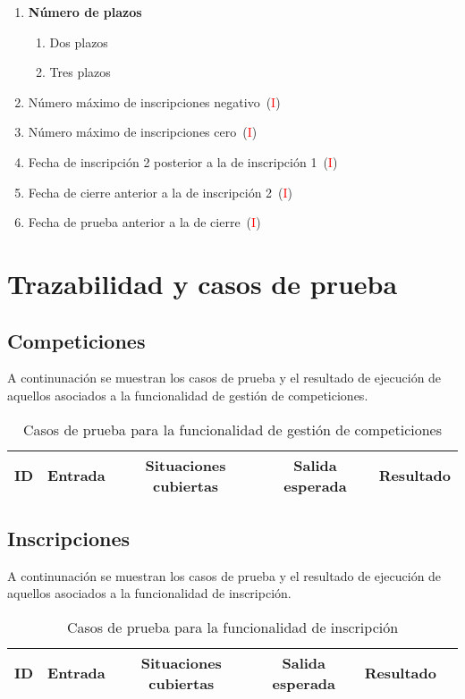 \begin{itemize}
\begin{enumerate}[label=SC\arabic*.]
			\item \textbf{Número de plazos}
			\begin{enumerate}[label*=\arabic*]
				\item Dos plazos
				\item Tres plazos
			\end{enumerate}
			\item Número máximo de inscripciones negativo~(\textcolor{red}{I})
			\item Número máximo de inscripciones cero~(\textcolor{red}{I})
			\item Fecha de inscripción 2 posterior a la de inscripción 1~(\textcolor{red}{I})
			\item Fecha de cierre anterior a la de inscripción 2~(\textcolor{red}{I})
			\item Fecha de prueba anterior a la de cierre~(\textcolor{red}{I})
		 \end{enumerate}
\end{itemize}

\section{Trazabilidad y casos de prueba}
\subsection{Competiciones}
A continunación se muestran los casos de prueba y el resultado de ejecución de aquellos asociados
a la funcionalidad de gestión de competiciones.

\begin{table}[ht]
	\centering
	\caption{Casos de prueba para la funcionalidad de gestión de competiciones}
	\begin{tabular}{|c|c|c|c|c|}
		\hline
		\textbf{ID} & \textbf{Entrada} & \textbf{Situaciones cubiertas} & \textbf{Salida esperada} & \textbf{Resultado} \\
		\hline
		\hline

		\hline
	\end{tabular}
\end{table}

\subsection{Inscripciones}
A continunación se muestran los casos de prueba y el resultado de ejecución de aquellos asociados
a la funcionalidad de inscripción.

\begin{table}
	\centering
	\caption{Casos de prueba para la funcionalidad de inscripción}
	\begin{tabular}{|c|c|c|c|c|c|}
		\hline
		\textbf{ID} & \textbf{Entrada} & \textbf{Situaciones cubiertas} & \textbf{Salida esperada} & \textbf{Resultado} \\
		\hline
		\hline

		\hline
	\end{tabular}
\end{table}
